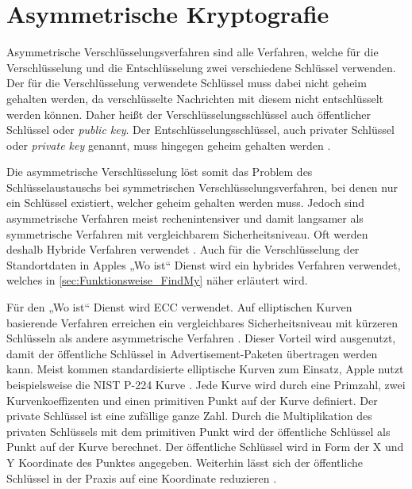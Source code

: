 \section{Asymmetrische Kryptografie}
\label{sec:asymmetrische_kryptografie}
Asymmetrische Verschlüsselungsverfahren sind alle Verfahren, welche für die Verschlüsselung und die Entschlüsselung zwei verschiedene Schlüssel verwenden.
Der für die Verschlüsselung verwendete Schlüssel muss dabei nicht geheim gehalten werden, da verschlüsselte Nachrichten mit diesem nicht entschlüsselt werden können.
Daher heißt der Verschlüsselungsschlüssel auch öffentlicher Schlüssel oder \textit{public key}.
Der Entschlüsselungsschlüssel, auch privater Schlüssel oder \textit{private key} genannt, muss hingegen geheim gehalten werden \cite[S. 173ff.]{Krypto}.

Die asymmetrische Verschlüsselung löst somit das Problem des Schlüsselaustauschs bei symmetrischen Verschlüsselungsverfahren, bei denen nur ein Schlüssel existiert, welcher geheim gehalten werden muss.
Jedoch sind asymmetrische Verfahren meist rechenintensiver und damit langsamer als symmetrische Verfahren mit vergleichbarem Sicherheitsniveau.
Oft werden deshalb Hybride Verfahren verwendet \cite[S. 178f.]{Krypto}.
Auch für die Verschlüsselung der Standortdaten in Apples „Wo ist“ Dienst wird ein hybrides Verfahren verwendet, welches in \autoref{sec:Funktionsweise_FindMy} näher erläutert wird.

Für den „Wo ist“ Dienst wird \ac{ECC} verwendet.
Auf elliptischen Kurven basierende Verfahren erreichen ein vergleichbares Sicherheitsniveau mit kürzeren Schlüsseln als andere asymmetrische Verfahren \cite[S. 273.]{Krypto}.
Dieser Vorteil wird ausgenutzt, damit der öffentliche Schlüssel in Advertisement-Paketen übertragen werden kann.
Meist kommen standardisierte elliptische Kurven zum Einsatz, Apple nutzt beispielsweise die NIST P-224 Kurve \cite{Heinrich_FindMy}.
Jede Kurve wird durch eine Primzahl, zwei Kurvenkoeffizenten und einen primitiven Punkt auf der Kurve definiert.
Der private Schlüssel ist eine zufällige ganze Zahl.
Durch die Multiplikation des privaten Schlüssels mit dem primitiven Punkt wird der öffentliche Schlüssel als Punkt auf der Kurve berechnet.
Der öffentliche Schlüssel wird in Form der X und Y Koordinate des Punktes angegeben.
Weiterhin lässt sich der öffentliche Schlüssel in der Praxis auf eine Koordinate reduzieren \cite[S. 284f.]{Krypto}.
